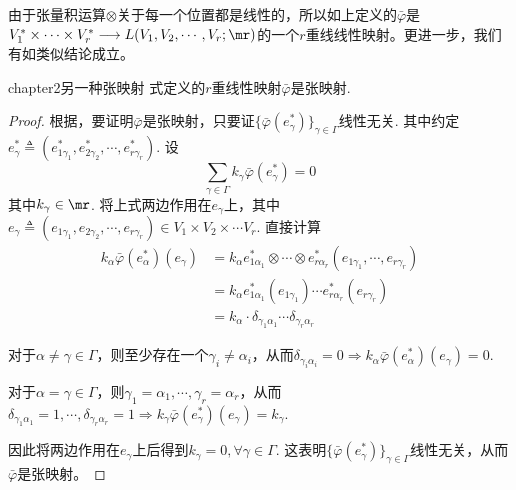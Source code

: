 由于张量积运算$\otimes$关于每一个位置都是线性的，所以如上定义的$\bar{\varphi}$是$V^{\ast}_{1}\times \cdots\times V^{\ast}_{r}\longrightarrow L(V_{1}, V_{2},\cdots ,V_{r};\mr)$的一个$r$重线线性映射。更进一步，我们有如类似结论成立。
\begin{mythm}{}{chapter2另一种张映射}
	式定义的$r$重线性映射$\bar{\varphi}$是张映射.
\end{mythm}
\begin{proof}
	根据，要证明$\bar{\varphi}$是张映射，只要证$\{\bar{\varphi}(e^{\ast}_{\gamma}) \}_{\gamma\in \Gamma}$线性无关. 其中约定$e^{\ast}_{\gamma}\triangleq (e^{\ast}_{1\gamma_{1}},e^{\ast}_{2\gamma_{2}},\cdots,e^{\ast}_{r\gamma_{r}})$. 设
	\begin{equation}
	\sum_{ \gamma\in \Gamma }k_{\gamma}\bar{\varphi}(e^{\ast}_{\gamma})=0
	\end{equation}
	其中$k_{\gamma}\in \mr$. 将上式两边作用在$e_{\gamma}$上，其中$e_{\gamma}\triangleq (e_{1\gamma_{1}},e_{2\gamma_{2}},\cdots,e_{r\gamma_{r}})\in V_{1}\times V_{2}\times\cdots V_{r}$. 直接计算
	\[
	\begin{split}
	k_{\alpha}\bar{\varphi}(e^{\ast}_{\alpha})(e_{\gamma})&=k_{\alpha}e^{\ast}_{1\alpha_{1}}\otimes \cdots\otimes e^{\ast}_{r\alpha_{r}}\left(e_{1\gamma_{1}},\cdots,e_{r\gamma_{r}} \right)\\
	&=k_{\alpha}e^{\ast}_{1\alpha_{ 1 }}\left(e_{1\gamma_{1}} \right)\cdots e^{\ast}_{r\alpha_{ r }}\left(e_{r\gamma_{r}} \right)\\
	&=k_{\alpha}\cdot \delta_{ \gamma_{1} \alpha_{ 1 } }\cdots \delta_{ \gamma_{r} \alpha_{ r } }
	\end{split}
	\]
	
	对于$\alpha\neq \gamma\in \Gamma$，则至少存在一个$\gamma_{ i }\neq\alpha_{ i }$，从而$\delta_{ \gamma_{i} \alpha_{ i } }=0\Rightarrow k_{\alpha}\bar{\varphi}(e^{\ast}_{\alpha})(e_{\gamma})=0$.
	
	对于$\alpha=\gamma\in\Gamma$，则$\gamma_{1}=\alpha_{ 1 },\cdots,\gamma_{r}=\alpha_{ r }$，从而$\delta_{ \gamma_{1} \alpha_{ 1 } }=1,\cdots, \delta_{ \gamma_{r} \alpha_{ r } }=1\Rightarrow k_{\gamma}\bar{\varphi}(e^{\ast}_{\gamma})(e_{\gamma})=k_{\gamma}$. 
	
	因此将两边作用在$e_{\gamma}$上后得到$k_{\gamma}=0,\forall \gamma\in \Gamma$. 这表明$\{\bar{\varphi}(e^{\ast}_{\gamma}) \}_{\gamma\in \Gamma}$线性无关，从而$\bar{\varphi}$是张映射。
\end{proof}

